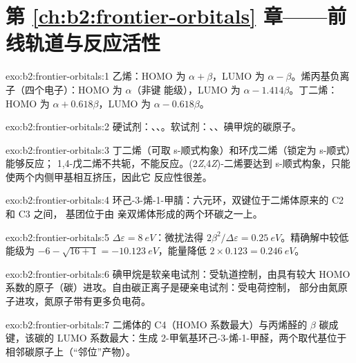 \section*{第 \ref{ch:b2:frontier-orbitals} 章——前线轨道与反应活性}

\begin{solution}{exo:b2:frontier-orbitals:1}
乙烯：HOMO 为 $\alpha + \beta$，LUMO 为 $\alpha - \beta$。烯丙基负离子（四个电子）：HOMO 为 $\alpha$（非键
能级），LUMO 为 $\alpha - 1.414\beta$。丁二烯：HOMO 为 $\alpha + 0.618\beta$，LUMO 为 $\alpha -
0.618\beta$。
\end{solution}

\begin{solution}{exo:b2:frontier-orbitals:2}
硬试剂：、、。软试剂：、、碘甲烷的碳原子。
\end{solution}

\begin{solution}{exo:b2:frontier-orbitals:3}
丁二烯（可取 s-顺式构象）和环戊二烯（锁定为 s-顺式）能够反应；
1,4-戊二烯不共轭，不能反应。(2\textit{Z},4\textit{Z})-二烯要达到
s-顺式构象，只能使两个内侧甲基相互挤压，因此它
反应性很差。
\end{solution}

\begin{solution}{exo:b2:frontier-orbitals:4}
环己-3-烯-1-甲腈：六元环，双键位于二烯体原来的 C2
和 C3 之间， 基团位于由
亲双烯体形成的两个环碳之一上。
\end{solution}

\begin{solution}{exo:b2:frontier-orbitals:5}
$\Delta\varepsilon = \qty{8}{eV}$：微扰法得 $2\beta^2/\Delta\varepsilon = \qty{0.25}{eV}$。精确解中较低能级为
$-6 - \sqrt{16 + 1} = \qty{-10.123}{eV}$，能量降低 $2 \times 0.123 = \qty{0.246}{eV}$。
\end{solution}

\begin{solution}{exo:b2:frontier-orbitals:6}
碘甲烷是软亲电试剂：受轨道控制，由具有较大
HOMO 系数的原子（碳）进攻。自由碳正离子是硬亲电试剂：受电荷控制，
部分由氮原子进攻，氮原子带有更多负电荷。
\end{solution}

\begin{solution}{exo:b2:frontier-orbitals:7}
二烯体的 C4（HOMO 系数最大）与丙烯醛的 $\beta$ 碳成键，该碳的
LUMO 系数最大：生成 2-甲氧基环己-3-烯-1-甲醛，两个取代基位于
相邻碳原子上（“邻位”产物）。
\end{solution}

